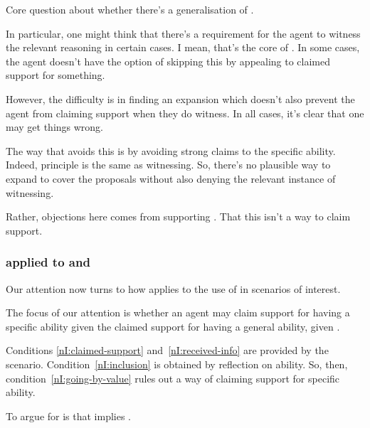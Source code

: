 \begin{note}
  Core question about whether there's a generalisation of \nI{}.

  In particular, one might think that there's a requirement for the agent to witness the relevant reasoning in certain cases.
  I mean, that's the core of \nI{}.
  In some cases, the agent doesn't have the option of skipping this by appealing to claimed support for something.

  However, the difficulty is in finding an expansion which doesn't also prevent the agent from claiming support when they do witness.
  In all cases, it's clear that one may get things wrong.

  The way that \ur{} avoids this is by avoiding strong claims to the specific ability.
  Indeed, principle is the same as witnessing.
  So, there's no plausible way to expand \nI{} to cover the proposals without also denying the relevant instance of witnessing.

  Rather, objections here comes from supporting \ESU{}.
  That this isn't a way to claim support.
\end{note}

\newpage

\subsubsection{\nI{} applied to \gsi{} and \AR{}}
\label{sec:ni-applies-ar}

\begin{note}
  Our attention now turns to how \nI{} applies to the use of \aben{} in scenarios of interest.

  The focus of our attention is whether an agent may claim support for having a specific ability given the claimed support for having a general ability, given \gsi{}.
\end{note}

\begin{note}
  Conditions \ref{nI:claimed-support} and~\ref{nI:received-info} are provided by the scenario.
  Condition~\ref{nI:inclusion} is obtained by reflection on ability.
  So, then, condition~\ref{nI:going-by-value} rules out a way of claiming support for specific ability.

  To argue for is that \AR{} implies \RBV{}.
\end{note}

